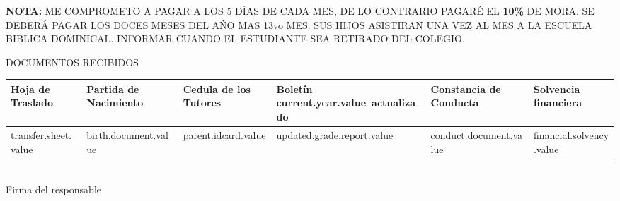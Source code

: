 \documentclass[12pt]{article}
\newcommand{\aField}[1]{\uline{\hspace{2mm} \textbf{#1} \hfill}}
\newcommand{\lineSlimStretch}{\singlespacing}
\newcommand{\lineStretch}{\setstretch{1.5}}
\newcommand{\currentYear}{current.year.value}
\newcommand{\transferSheet}{transfer.sheet.value}
\newcommand{\birthDocument}{birth.document.value}
\newcommand{\parentIdcard}{parent.idcard.value}
\newcommand{\updatedGradeReport}{updated.grade.report.value}
\newcommand{\conductDocument}{conduct.document.value}
\newcommand{\financialSolvency}{financial.solvency.value}
\begin{document}
    \lineSlimStretch
    \textbf{NOTA:} ME COMPROMETO A PAGAR A LOS 5 DÍAS DE CADA MES, DE LO CONTRARIO PAGARÉ EL \uline{\textbf{10\%}} DE MORA.
    SE DEBERÁ PAGAR LOS DOCES MESES DEL AÑO MAS 13vo MES.
    SUS HIJOS ASISTIRAN UNA VEZ AL MES A LA ESCUELA BIBLICA DOMINICAL.
    INFORMAR CUANDO EL ESTUDIANTE SEA RETIRADO DEL COLEGIO.

    \lineStretch
    DOCUMENTOS RECIBIDOS
    \begin{table}[H]
        \centering
        \begin{tabular}{|p{2cm}|p{2.3cm}|p{2.5cm}|p{2.8cm}|p{2.5cm}|p{2.5cm}|}
            \hline
            Hoja de Traslado &
            Partida de Nacimiento &
            Cedula de los Tutores &
            Boletín \currentYear\ actualizado &
            Constancia de Conducta &
            Solvencia financiera\\
            \hline
            \transferSheet &
            \birthDocument &
            \parentIdcard &
            \updatedGradeReport &
            \conductDocument &
            \financialSolvency\\
            \hline
        \end{tabular}
    \end{table}
    
    \begin{center}
        \aField{\hspace{6cm}}\\
        Firma del responsable
    \end{center}
\end{document}
